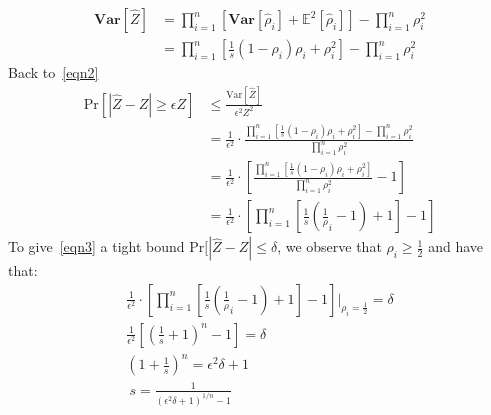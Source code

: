 \documentclass[12pt]{article}
\newenvironment{solution}[2][Solution]{\begin{trivlist}
\item[\hskip \labelsep {\bfseries #1}\hskip \labelsep {\bfseries #2.}]}{\end{trivlist}}
\begin{document}
\begin{solution}{3}
    \begin{align*}
        \mathbf{Var}[\hat Z] & = \prod_{i=1}^n[\mathbf{Var}[\hat \rho_i] + \mathbb{E}^2[\hat \rho_i]] - \prod_{i=1}^n \rho_i^2 \\
        & = \prod_{i=1}^n[\frac1s(1-\rho_i)\rho_i + \rho_i^2] - \prod_{i=1}^n \rho_i^2
    \end{align*}
    Back to~\eqref{eqn2}
    \begin{align}
        \mathrm{Pr}[|\hat Z - Z| \ge \epsilon Z] & \le \frac{\mathrm{Var}[\hat Z]}{\epsilon^2Z^2} \\
        & =  \frac{1}{\epsilon^2} \cdot \frac{\prod_{i=1}^n[\frac1s(1-\rho_i)\rho_i + \rho_i^2] - \prod_{i=1}^n \rho_i^2}{\prod_{i=1}^n \rho_i^2} \\
        & = \frac{1}{\epsilon^2} \cdot [\frac{\prod_{i=1}^n[\frac1s(1-\rho_i)\rho_i + \rho_i^2]}{\prod_{i=1}^n \rho_i^2} -1]\\
        & = \label{eqn3}\frac{1}{\epsilon^2} \cdot [\prod_{i=1}^n[\frac1s(\frac1\rho_i-1) + 1] -1]
    \end{align}
    To give~\eqref{eqn3} a tight bound $\mathrm{Pr}[|\hat Z - Z| \le \delta$, we observe that $\rho_i \ge \frac12$ and have that:
    \begin{gather*}
        \frac{1}{\epsilon^2} \cdot [\prod_{i=1}^n[\frac1s(\frac1\rho_i-1) + 1] -1]|_{\rho_i = \frac12} = \delta \\
        \frac{1}{\epsilon^2}[(\frac1s+1)^n-1] = \delta \\
        (1 + \frac1s)^n = \epsilon^2\delta + 1 \\\
        s = \frac{1}{(\epsilon^2\delta + 1)^{1/n}-1}
    \end{gather*}
\end{solution}
\end{document}
